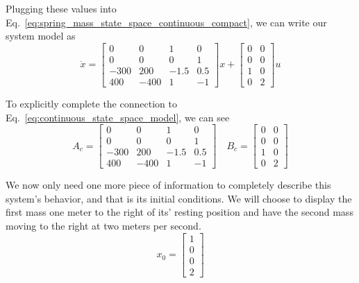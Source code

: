 Plugging these values into Eq.~\ref{eq:spring_mass_state_space_continuous_compact}, we can write our system model as
\begin{equation} 
    \dot x =
    \begin{bmatrix}
        0 & 0 & 1 & 0 \\
        0 & 0 & 0 & 1 \\
        -300 & 200 & -1.5 & 0.5 \\
        400 & -400 & 1 & -1
    \end{bmatrix}
    x +
    \begin{bmatrix}
        0 & 0 \\
        0 & 0 \\
        1 & 0 \\
        0 & 2
    \end{bmatrix}
    u
    \label{eq:spring_mass_state_space_continuous_real}
\end{equation}

To explicitly complete the connection to Eq.~\ref{eq:continuous_state_space_model}, we can see
\begin{equation} 
    A_c =
    \begin{bmatrix}
        0 & 0 & 1 & 0 \\
        0 & 0 & 0 & 1 \\
        -300 & 200 & -1.5 & 0.5 \\
        400 & -400 & 1 & -1
    \end{bmatrix}
    \quad
    B_c = 
    \begin{bmatrix}
        0 & 0 \\
        0 & 0 \\
        1 & 0 \\
        0 & 2
    \end{bmatrix}
    \label{eq:Ac_Bc_real}
\end{equation}

We now only need one more piece of information to completely describe this system's behavior, and that is its initial conditions. We will choose to display the first mass one meter to the right of its' resting position and have the second mass moving to the right at two meters per second.
\begin{equation}
    x_0 =
    \begin{bmatrix}
        1 \\ 0 \\ 0 \\ 2
    \end{bmatrix}
    \label{eq:initial_conditions_real}
\end{equation}

